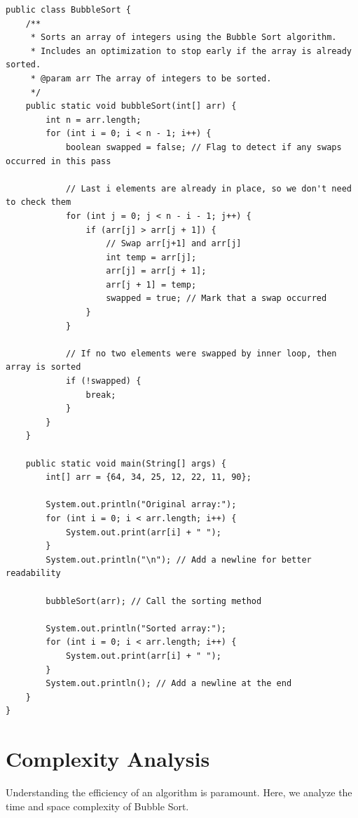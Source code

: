 \documentclass{article}
\begin{document}
\begin{verbatim}
public class BubbleSort {
    /**
     * Sorts an array of integers using the Bubble Sort algorithm.
     * Includes an optimization to stop early if the array is already sorted.
     * @param arr The array of integers to be sorted.
     */
    public static void bubbleSort(int[] arr) {
        int n = arr.length;
        for (int i = 0; i < n - 1; i++) {
            boolean swapped = false; // Flag to detect if any swaps occurred in this pass

            // Last i elements are already in place, so we don't need to check them
            for (int j = 0; j < n - i - 1; j++) {
                if (arr[j] > arr[j + 1]) {
                    // Swap arr[j+1] and arr[j]
                    int temp = arr[j];
                    arr[j] = arr[j + 1];
                    arr[j + 1] = temp;
                    swapped = true; // Mark that a swap occurred
                }
            }

            // If no two elements were swapped by inner loop, then array is sorted
            if (!swapped) {
                break;
            }
        }
    }

    public static void main(String[] args) {
        int[] arr = {64, 34, 25, 12, 22, 11, 90};

        System.out.println("Original array:");
        for (int i = 0; i < arr.length; i++) {
            System.out.print(arr[i] + " ");
        }
        System.out.println("\n"); // Add a newline for better readability

        bubbleSort(arr); // Call the sorting method

        System.out.println("Sorted array:");
        for (int i = 0; i < arr.length; i++) {
            System.out.print(arr[i] + " ");
        }
        System.out.println(); // Add a newline at the end
    }
}
\end{verbatim}

\section*{Complexity Analysis}
Understanding the efficiency of an algorithm is paramount. Here, we analyze the time and space complexity of Bubble Sort.
\end{document}
